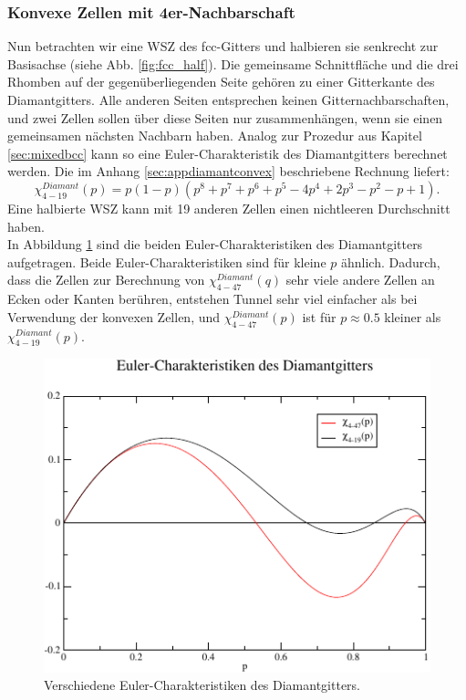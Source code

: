 \subsubsection{Konvexe Zellen mit 4er-Nachbarschaft}
Nun betrachten wir eine WSZ des fcc-Gitters und halbieren sie senkrecht zur Basisachse (siehe Abb. \ref{fig:fcc_half}). Die gemeinsame Schnittfl\"ache und die drei Rhomben auf der gegen\"uberliegenden Seite geh\"oren zu einer Gitterkante des Diamantgitters. Alle anderen Seiten entsprechen keinen Gitternachbarschaften, und zwei Zellen sollen \"uber diese Seiten nur zusammenh\"angen, wenn sie einen gemeinsamen n\"achsten Nachbarn haben. Analog zur Prozedur aus Kapitel \ref{sec:mixedbcc} kann so eine Euler-Charakteristik des Diamantgitters berechnet werden. Die im Anhang \ref{sec:appdiamantconvex} beschriebene Rechnung liefert: 
\begin{equation}
  \chi^{Diamant}_{4-19}(p)=p(1-p)(p^8+p^7+p^6+p^5-4p^4+2p^3-p^2-p+1).
\end{equation}
Eine halbierte WSZ kann mit 19 anderen Zellen einen nichtleeren Durchschnitt haben. \\

In Abbildung \ref{fig:diamantplot} sind die beiden Euler-Charakteristiken des Diamantgitters aufgetragen. Beide Euler-Charakteristiken sind f\"ur kleine $p$ \"ahnlich. Dadurch, dass die Zellen zur Berechnung von $\chi^{Diamant}_{4-47}(q)$ sehr viele andere Zellen an Ecken oder Kanten ber\"uhren, entstehen Tunnel sehr viel einfacher als bei Verwendung der konvexen Zellen, und $\chi^{Diamant}_{4-47}(p)$ ist f\"ur $p\approx0.5$ kleiner als $\chi^{Diamant}_{4-19}(p)$.
\begin{figure}[tbp]
  \centering
  \includegraphics{./Schranken-figs/chidiamant}
  \caption{Verschiedene Euler-Charakteristiken des Diamantgitters.  }
  \label{fig:diamantplot}
\end{figure}

